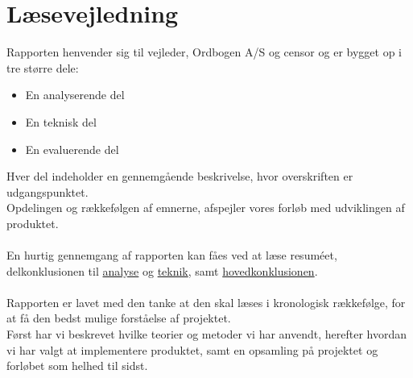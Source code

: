 \section{Læsevejledning}
Rapporten henvender sig til vejleder, Ordbogen A/S og censor og er bygget op i tre større dele:
\begin{itemize}
    \item{En analyserende del}
    \item{En teknisk del}
    \item{En evaluerende del}
\end{itemize}
Hver del indeholder en gennemgående beskrivelse, hvor overskriften er udgangspunktet. 
\\
Opdelingen og rækkefølgen af emnerne, afspejler vores forløb med udviklingen af produktet.
\\\\
En hurtig gennemgang af rapporten kan fåes ved at læse resuméet, delkonklusionen til \hyperlink{delkonklusion-analyse}{analyse} og \hyperlink{delkonklusion-teknik}{teknik}, samt \hyperlink{konklusion}{hovedkonklusionen}.
\\\\
Rapporten er lavet med den tanke at den skal læses i kronologisk rækkefølge, for at få den bedst mulige forståelse af projektet.\\
Først har vi beskrevet hvilke teorier og metoder vi har anvendt, herefter hvordan vi har valgt at implementere produktet,
samt en opsamling på projektet og forløbet som helhed til sidst.

